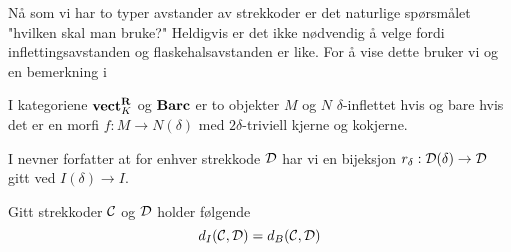 Nå som vi har to typer avstander av strekkoder er det
naturlige spørsmålet "hvilken skal man bruke?" Heldigvis
er det ikke nødvendig å velge fordi inflettingsavstanden
og flaskehalsavstanden er like. For å vise dette bruker vi
\citep[proposisjon 4.2]{Bauer2020} og en bemerkning
i \citep[seksjon 4.2]{Bauer2020}

\begin{proposisjon}\label{prop:Prop2.4-Bauer2020}
  I kategoriene $\textnormal{\textbf{vect}}_K^{\textnormal{\textbf{{R}}}}$ og $\textnormal{\textbf{Barc}}$ er to objekter $M$ og $N$
  $\delta$-inflettet hvis og bare hvis det er en morfi $f: M\to
  N(\delta)$ med $2\delta$-triviell kjerne og kokjerne.
\end{proposisjon}

\begin{bemerk}\label{bem:r_delta}
  I \citep[seksjon 4.2]{Bauer2020} nevner forfatter at for
  enhver strekkode $\mathcal{D}$ har vi en bijeksjon 
  $r_\delta:\mathcal{D}(\delta)\to\mathcal{D}$ gitt ved $I(\delta)\to
  I$.
\end{bemerk}

\begin{teorem}\label{trm:FA_lik_IA}
Gitt strekkoder $\mathcal{C}$ og $\mathcal{D}$ holder følgende
\[d_I(\mathcal{C},\mathcal{D}) = d_B(\mathcal{C},\mathcal{D})\]
\end{teorem}
